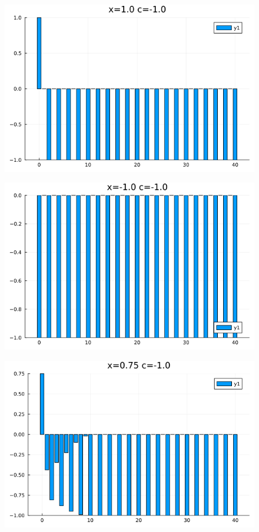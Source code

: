 \documentclass{article}
\begin{document}
        \begin{figure}[H]
        \centering
        \includegraphics[width=0.75\linewidth]{6 x=1.0 c=-1.0.png}
        \label{fig:enter-label}
    \end{figure}
        \begin{figure}[H]
        \centering
        \includegraphics[width=0.75\linewidth]{6 x=-1.0 c=-1.0.png}
        \label{fig:enter-label}
    \end{figure}
        \begin{figure}[H]
        \centering
        \includegraphics[width=0.75\linewidth]{6 x=0.75 c=-1.0.png}
        \label{fig:enter-label}
    \end{figure}
\end{document}
